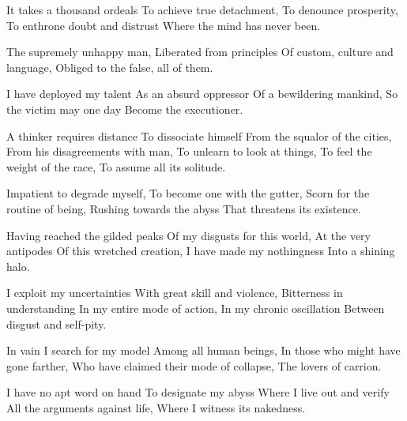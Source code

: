 \documentclass{article}
\newenvironment{stanza}{\begin{minipage}{10cm}\begin{internallinenumbers}\obeylines}{\end{internallinenumbers}\end{minipage}\vspace{\baselineskip}}
\begin{document}
\begin{stanza}
It takes a thousand ordeals
To achieve true detachment,
To denounce prosperity,
To enthrone doubt and distrust
Where the mind has never been.
\end{stanza}

\begin{stanza}
The supremely unhappy man,
Liberated from principles
Of custom, culture and language,
Obliged to the false, all of them.
\end{stanza}

\begin{stanza}
I have deployed my talent
As an absurd oppressor
Of a bewildering mankind,
So the victim may one day
Become the executioner.
\end{stanza}

\begin{stanza}
A thinker requires distance
To dissociate himself
From the squalor of the cities,
From his disagreements with man,
To unlearn to look at things,
To feel the weight of the race,
To assume all its solitude.
\end{stanza}

\begin{stanza}
Impatient to degrade myself,
To become one with the gutter,
Scorn for the routine of being,
Rushing towards the abyss
That threatens its existence.
\end{stanza}

\begin{stanza}
Having reached the gilded peaks
Of my disgusts for this world,
At the very antipodes
Of this wretched creation,
I have made my nothingness
Into a shining halo.
\end{stanza}

\begin{stanza}
I exploit my uncertainties
With great skill and violence,
Bitterness in understanding
In my entire mode of action,
In my chronic oscillation
Between disgust and self-pity.
\end{stanza}

\begin{stanza}
In vain I search for my model
Among all human beings,
In those who might have gone farther,
Who have claimed their mode of collapse,
The lovers of carrion.
\end{stanza}

\begin{stanza}
I have no apt word on hand
To designate my abyss
Where I live out and verify
All the arguments against life,
Where I witness its nakedness.
\end{stanza}
\end{document}
